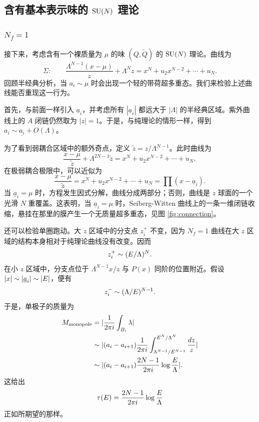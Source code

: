 \subsection{含有基本表示味的 $\mathop{\mathrm{SU}}(N)$ 理论}
\subsubsection{$N_f=1$}
接下来，考虑含有一个裸质量为 $\mu$ 的味 $(Q,\tilde Q)$ 的 $\mathop{\mathrm{SU}}(N)$ 理论。曲线为
\begin{equation}
\Sigma:\qquad\frac{\Lambda^{N-1}(x-\mu)}z+\Lambda^Nz=x^N+u_2x^{N-2}+\cdots+u_N.
\end{equation}
回顾半经典分析，当 $a_i\sim\mu$ 时会出现一个轻的带荷超多重态。我们来检验上述曲线能否重现这一行为。

首先，与前面一样引入 $\underline a_i$，并考虑所有 $|\underline a_i|$ 都远大于 $|\Lambda|$ 的半经典区域。紫外曲线上的 $A$ 闭链仍然取为 $|z|=1$。于是，与纯理论的情形一样，得到 $a_i\sim\underline{a_i}+O(\Lambda)$。

为了看到弱耦合区域中的额外奇点，定义 $\tilde z=z/\Lambda^{N-1}$。此时曲线为
\begin{equation}
\frac{x-\mu}{\tilde z}+\Lambda^{2N-1}\tilde z=x^N+u_2x^{N-2}+\cdots+u_N,
\end{equation}
在极弱耦合极限中，可以近似为
\begin{equation}
\frac{x-\mu}{\tilde z}=x^N+u_2x^{N-2}+\cdots+u_N=\prod(x-\underline a_i).
\end{equation}
当 $\underline a_i=\mu$ 时，方程发生因式分解，曲线分成两部分；否则，曲线是 $z$ 球面的一个光滑 $N$ 重覆盖。这表明，当 $\underline a_i=\mu$ 时，Seiberg-Witten 曲线上的一条一维闭链收缩，悬挂在那里的膜产生一个无质量超多重态，见图 \ref{fig:connection}。

还可以检验单圈跑动。大 $z$ 区域中的分支点 $z_i^+$ 不变，因为 $N_f=1$ 曲线在大 $z$ 区域的结构本身相对于纯理论曲线没有改变。因而
\begin{equation}
z_i^+\sim(E/\Lambda)^N.
\end{equation}
在小 $z$ 区域中，分支点位于 $\Lambda^{N-1}x/z$ 与 $P(x)$ 同阶的位置附近。假设 $|x|\sim|\underline a_i|\sim|E|$，便有
\begin{equation}
z_i^-\sim(\Lambda/E)^{N-1}.
\end{equation}
于是，单极子的质量为
\begin{align}
M_\text{monopole}&=|\frac1{2\pi i}\int_{B_i}\lambda|\\
&\sim|(a_i-a_{i+1})\frac1{2\pi i}\int_{\Lambda^{N-1}/E^{N-1}}^{E^N/\Lambda^N}\frac{dz}z|\\
&\sim|(a_i-a_{i+1})\frac{2N-1}{2\pi i}\log\frac{E}\Lambda|.
\end{align}
这给出
\begin{equation}
\tau(E)=\frac{2N-1}{2\pi i}\log\frac{E}\Lambda
\end{equation}
正如所期望的那样。

